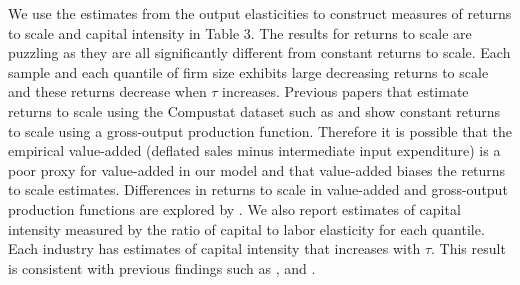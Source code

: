 \documentclass[11pt]{article}
\begin{document}
We use the estimates from the output elasticities to construct measures of returns to scale and capital intensity in Table 3. The results for returns to scale are puzzling as they are all significantly different from constant returns to scale. Each sample and each quantile of firm size exhibits large decreasing returns to scale and these returns decrease when $\tau$ increases. Previous papers that estimate returns to scale using the Compustat dataset such as \cite{Keller2009} and \cite{mert} show constant returns to scale using a gross-output production function. Therefore it is possible that the empirical value-added (deflated sales minus intermediate input expenditure) is a poor proxy for value-added in our model and that value-added biases the returns to scale estimates. Differences in returns to scale in value-added and gross-output production functions are explored by \cite{Basu1997}. We also report estimates of capital intensity measured by the ratio of capital to labor elasticity for each quantile. Each industry has estimates of capital intensity that increases with $\tau$. This result is consistent with previous findings such as \cite{Holmes2008}, \cite{Kumar1999} and \cite{mert}.
\end{document}
